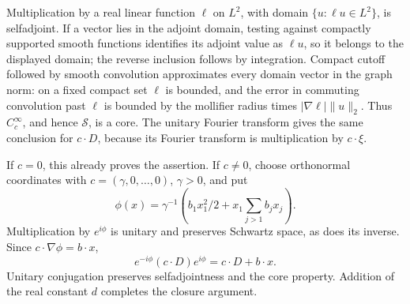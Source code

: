 \documentclass[
  11pt,
]{article}
\begin{document}
Multiplication by a real linear function \(\ell\) on \(L^2\), with
domain \(\{u:\ell u\in L^2\}\), is selfadjoint. If a vector lies in the
adjoint domain, testing against compactly supported smooth functions
identifies its adjoint value as \(\ell u\), so it belongs to the
displayed domain; the reverse inclusion follows by integration. Compact
cutoff followed by smooth convolution approximates every domain vector
in the graph norm: on a fixed compact set \(\ell\) is bounded, and the
error in commuting convolution past \(\ell\) is bounded by the mollifier
radius times \(|\nabla\ell|\|u\|_2\). Thus \(C_c^\infty\), and hence
\(\mathcal S\), is a core. The unitary Fourier transform gives the same
conclusion for \(c\cdot D\), because its Fourier transform is
multiplication by \(c\cdot\xi\).

If \(c=0\), this already proves the assertion. If \(c\ne0\), choose
orthonormal coordinates with \(c=(\gamma,0,\ldots,0)\), \(\gamma>0\),
and put \[
\phi(x)=\gamma^{-1}
\left(b_1x_1^2/2+x_1\sum_{j>1}b_jx_j\right).
\] Multiplication by \(e^{i\phi}\) is unitary and preserves Schwartz
space, as does its inverse. Since \(c\cdot\nabla\phi=b\cdot x\), \[
e^{-i\phi}(c\cdot D)e^{i\phi}=c\cdot D+b\cdot x.
\] Unitary conjugation preserves selfadjointness and the core property.
Addition of the real constant \(d\) completes the closure argument.
\end{document}
